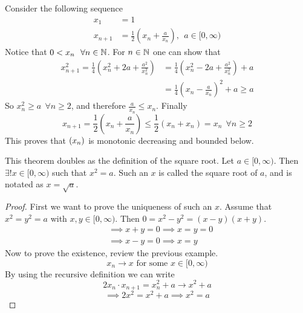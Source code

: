 \documentclass[../../script.tex]{subfiles}
\begin{document}
\begin{eg}
Consider the following sequence
\begin{align*}
	x_1 &= 1 \\
	x_{n+1} &= \frac{1}{2}\left(x_n + \frac{a}{x_n}\right), ~~a \in [0, \infty)
\end{align*}
Notice that $0 < x_n ~~\forall n \in \mathbb{N}$. For $n \in \mathbb{N}$ one can show that
\[
\begin{split}
	x_{n+1}^2 = \frac{1}{4} \left(x_n^2 + 2a + \frac{a^2}{x_n^2} \right) &= \frac{1}{4} \left(x_n^2 - 2a + \frac{a^2}{x_n^2} \right) + a \\
	&= \frac{1}{4} \left(x_n - \frac{a}{x_n} \right)^2 + a \ge a
\end{split}
\]
So $x_n^2 \ge a ~~\forall n \ge 2$, and therefore $\frac{a}{x_n} \le x_n$. Finally
\[
	x_{n+1} = \frac{1}{2}\left(x_n + \frac{a}{x_n}\right) \le \frac{1}{2}\left(x_n + x_n\right) = x_n ~~\forall n \ge 2
\]
This proves that $(x_n)$ is monotonic decreasing and bounded below.
\end{eg}

\begin{thm}
This theorem doubles as the definition of the square root. Let $a \in [0, \infty)$. Then $\exists! x \in [0, \infty)$ such that $x^2 = a$. Such an $x$ is called the square root of $a$, and is notated as $x = \sqrt{a}$.
\end{thm}
\begin{proof}
First we want to prove the uniqueness of such an $x$. Assume that $x^2 = y^2 = a$ with $x, y \in [0, \infty)$. Then $0 = x^2 - y^2 = (x-y)(x+y)$.
\begin{align}
	&\implies x + y = 0 \implies x = y = 0 \\
	&\implies x - y = 0 \implies x = y
\end{align}
Now to prove the existence, review the previous example.
\begin{equation}
	x_n \longrightarrow x \text{ for some } x \in [0, \infty)
\end{equation}
By using the recursive definition we can write
\begin{equation}
	2x_n \cdot x_{n+1} = x_n^2 + a \longrightarrow x^2 + a
\end{equation}
\begin{equation}
	\implies 2x^2 = x^2 + a \implies x^2 = a
\end{equation}
\end{proof}
\end{document}
